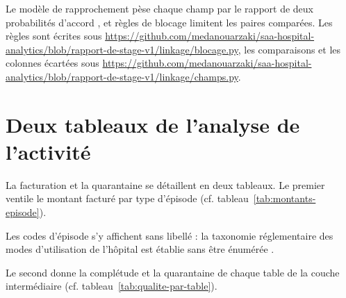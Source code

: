 Le modèle de rapprochement pèse chaque champ par le rapport de deux probabilités d'accord
\cite{s22}, et  règles de blocage limitent les paires comparées. Les règles sont écrites
sous \url{https://github.com/medanouarzaki/saa-hospital-analytics/blob/rapport-de-stage-v1/linkage/blocage.py}, les comparaisons et les colonnes écartées
sous \url{https://github.com/medanouarzaki/saa-hospital-analytics/blob/rapport-de-stage-v1/linkage/champs.py}.

\section{Deux tableaux de l'analyse de l'activité}\label{sec:complements-analyse}

La facturation et la quarantaine se détaillent en deux tableaux. Le premier ventile le montant
facturé par type d'épisode (cf. tableau~\ref{tab:montants-episode}).

\begin{table}[htbp]
\centering
\caption{Montants facturés par type d'épisode, en dirhams}\label{tab:montants-episode}
\footnotesize
{}
\end{table}

Les  codes d'épisode s'y affichent sans libellé : la taxonomie réglementaire des modes
d'utilisation de l'hôpital est établie sans être énumérée \cite{s27}.

Le second donne la complétude et la quarantaine de chaque table de la couche intermédiaire (cf.
tableau~\ref{tab:qualite-par-table}).

